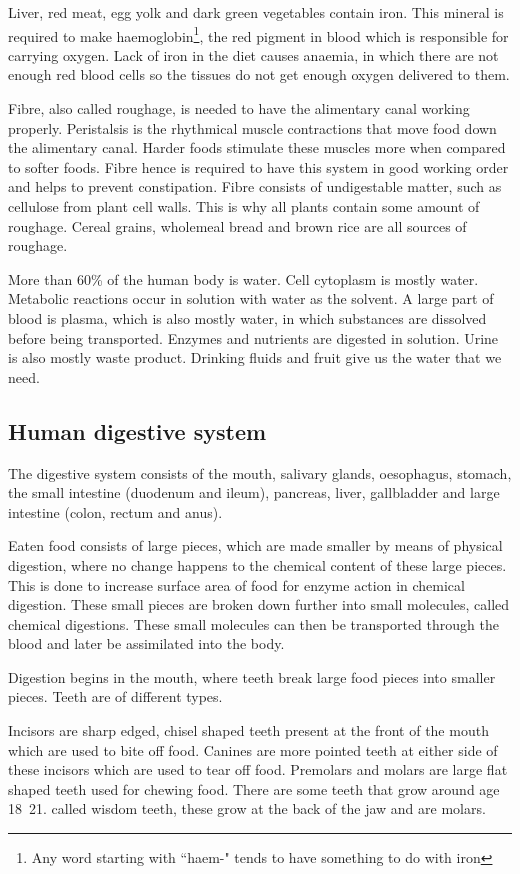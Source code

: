 Liver, red meat, egg yolk and dark green vegetables contain iron. This mineral is required to make
haemoglobin\footnote{Any word starting with ``haem-" tends to have something to do with iron}, the
red pigment in blood which is responsible for carrying oxygen. Lack of iron in the diet causes
anaemia, in which there are not enough red blood cells so the tissues do not get enough oxygen
delivered to them.

Fibre, also called roughage, is needed to have the alimentary canal working properly. Peristalsis
is the rhythmical muscle contractions that move food down the alimentary canal. Harder foods 
stimulate these muscles more when compared to softer foods. Fibre hence is required to have this
system in good working order and helps to prevent constipation. Fibre consists of undigestable 
matter, such as cellulose from plant cell walls. This is why all plants contain some amount of
roughage. Cereal grains, wholemeal bread and brown rice are all sources of roughage.


More than 60\% of the human body is water. Cell cytoplasm is mostly water. Metabolic reactions
occur in solution with water as the solvent. A large part of blood is plasma, which is also mostly
water, in which substances are dissolved before being transported. Enzymes and nutrients are
digested in solution. Urine is also mostly waste product. Drinking fluids and fruit give us the
water that we need.
\subsection{Human digestive system}

The digestive system consists of the mouth, salivary glands, oesophagus, stomach, the small
intestine (duodenum and ileum), pancreas, liver, gallbladder and large intestine (colon, rectum
and anus).

Eaten food consists of large pieces, which are made smaller by means of physical digestion, where
no change happens to the chemical content of these large pieces. This is done to increase surface
area of food for enzyme action in chemical digestion.
These small pieces are broken down further into small molecules, called chemical digestions. These 
small
molecules can then be transported through the blood and later be assimilated into the body.

Digestion begins in the mouth, where teeth break large food pieces into smaller pieces. Teeth are
of different types.

Incisors are sharp edged, chisel shaped teeth present at the front of the mouth which are used to
bite off food. Canines are more pointed teeth at either side of these incisors which are used to
tear off food. Premolars and molars are large flat shaped teeth used for chewing food. There are
some teeth that grow around age 18~21. called wisdom teeth, these grow at the back of the jaw
and are molars.

